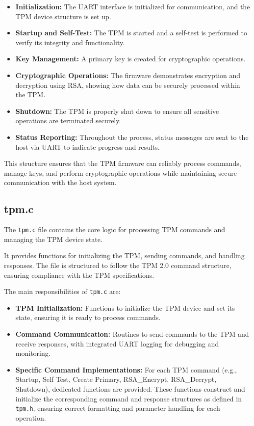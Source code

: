 \begin{itemize}
    \item \textbf{Initialization:} The UART interface is 
    initialized for communication, and the TPM device 
    structure is set up.
    \item \textbf{Startup and Self-Test:} The TPM is 
    started and a self-test is performed to verify its 
    integrity and functionality.
    \item \textbf{Key Management:} A primary key is 
    created for cryptographic operations.
    \item \textbf{Cryptographic Operations:} The firmware 
    demonstrates encryption and decryption using RSA, 
    showing how data can be securely processed within 
    the TPM.
    \item \textbf{Shutdown:} The TPM is properly shut 
    down to ensure all sensitive operations are 
    terminated securely.
    \item \textbf{Status Reporting:} Throughout the 
    process, status messages are sent to the host 
    via UART to indicate progress and results.
\end{itemize}

This structure ensures that the TPM firmware can reliably 
process commands, manage keys, and perform cryptographic 
operations while maintaining secure communication with 
the host system.


\subsection{tpm.c}

The \texttt{tpm.c} file contains the core logic for 
processing TPM commands and managing the TPM device state.

It provides functions for initializing the TPM, sending commands,
and handling responses. The file is structured to follow
the TPM 2.0 command structure, ensuring compliance with the
TPM specifications.

The main responsibilities of \texttt{tpm.c} are:

\begin{itemize}
    \item \textbf{TPM Initialization:} Functions to 
    initialize the TPM device and set its state,
    ensuring it is ready to process commands.
    \item \textbf{Command Communication:} Routines to 
    send commands to the TPM and receive responses, 
    with integrated UART logging for debugging and 
    monitoring.
    \item \textbf{Specific Command Implementations:} For 
    each TPM command (e.g., Startup, Self Test, Create 
    Primary, RSA\_Encrypt, RSA\_Decrypt, Shutdown),
    dedicated functions are provided. These functions 
    construct and initialize the corresponding command 
    and response structures as defined in \texttt{tpm.h}, 
    ensuring correct formatting and parameter handling 
    for each operation.
\end{itemize}

